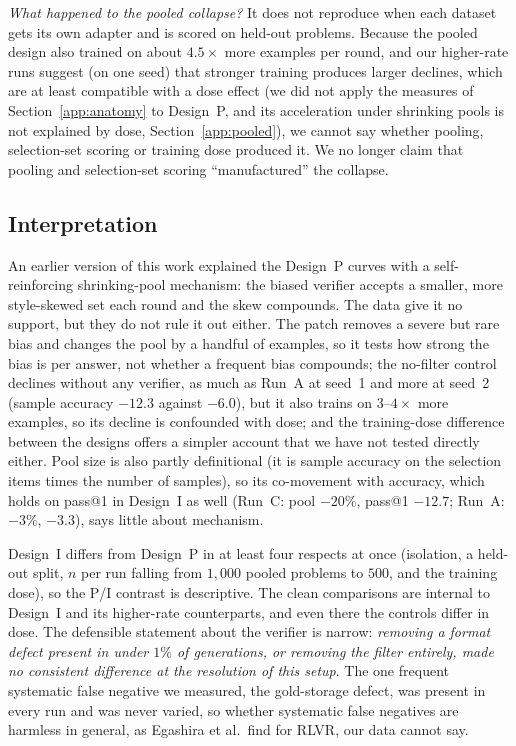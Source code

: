 \documentclass[runningheads]{llncs}
\begin{document}
\emph{What happened to the pooled collapse?} It does not reproduce when each
dataset gets its own adapter and is scored on held-out problems. Because the
pooled design also trained on about $4.5\times$ more examples per round, and our
higher-rate runs suggest (on one seed) that stronger training produces larger
declines, which are at least compatible with a dose effect (we did not apply
the measures of Section~\ref{app:anatomy} to Design~P, and its acceleration
under shrinking pools is not explained by dose, Section~\ref{app:pooled}),
we cannot say whether pooling, selection-set scoring or training dose produced
it. We no longer claim that pooling and selection-set scoring ``manufactured''
the collapse.

\subsection{Interpretation}
An earlier version of this work explained the Design~P curves with a
self-reinforcing shrinking-pool mechanism: the biased verifier accepts a smaller,
more style-skewed set each round and the skew compounds. The data give it no
support, but they do not rule it out either. The patch removes a severe but rare
bias and changes the pool by a handful of examples, so it tests how strong the
bias is per answer, not whether a frequent bias compounds; the no-filter control
declines without any verifier, as much as Run~A at seed~1 and more at seed~2
(sample accuracy $-12.3$ against $-6.0$), but it also trains on $3$--$4\times$
more examples, so its decline is confounded with dose; and the training-dose
difference between the designs offers a simpler account that we have not tested
directly either. Pool size is also partly
definitional (it is sample accuracy on the selection items times the number of
samples), so its co-movement with accuracy, which holds on pass@1 in Design~I as
well (Run~C: pool $-20\%$, pass@1 $-12.7$; Run~A: $-3\%$, $-3.3$), says little
about mechanism.

Design~I differs from Design~P in at least four respects at once (isolation, a
held-out split, $n$ per run falling from $1{,}000$ pooled problems to $500$, and
the training dose), so the P/I contrast is descriptive. The clean comparisons are
internal to Design~I and its higher-rate counterparts, and even there the
controls differ in dose. The defensible statement about the verifier is narrow:
\emph{removing a format defect present in under $1\%$ of generations, or
removing the filter entirely, made no consistent difference at the resolution of
this setup}. The one frequent systematic false negative we measured, the
gold-storage defect, was present in every run and was never varied, so whether
systematic false negatives are harmless in general, as Egashira et al.\ find for
RLVR, our data cannot say.
\end{document}

